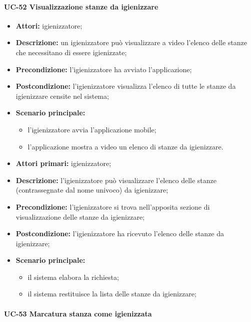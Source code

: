 \paragraph{UC-52 Visualizzazione stanze da igienizzare}
\begin{itemize}
    \item \textbf{Attori:} igienizzatore;
    \item \textbf{Descrizione:} un igienizzatore pu\`{o} visualizzare a video l'elenco delle stanze che necessitano di essere igienizzate;
    \item \textbf{Precondizione:} l'igienizzatore ha avviato l'applicazione;
    \item \textbf{Postcondizione:} l'igienizzatore visualizza l'elenco di tutte le stanze da igienizzare censite nel sistema;
    \item \textbf{Scenario principale:}
    \begin{itemize}
        \item l'igienizzatore avvia l'applicazione mobile;
        \item l'applicazione mostra a video un elenco di stanze da igienizzare.
    \end{itemize}
\end{itemize}

    \begin{itemize}
        \item \textbf{Attori primari:} igienizzatore;
        \item \textbf{Descrizione:} l’igienizzatore può visualizzare l'elenco delle stanze (contrassegnate dal nome univoco) da igienizzare;
        \item \textbf{Precondizione:} l'igienizzatore si trova nell’apposita sezione di visualizzazione delle stanze da igienizzare; 
        \item \textbf{Postcondizione:} l'igienizzatore ha ricevuto l'elenco delle stanze da igienizzare;
        \item \textbf{Scenario principale:} 
            \begin{itemize}
                \item il sistema elabora la richiesta;
                \item il sistema restituisce la lista delle stanze da igienizzare;
            \end{itemize}
    \end{itemize}
\paragraph{UC-53 Marcatura stanza come igienizzata}

